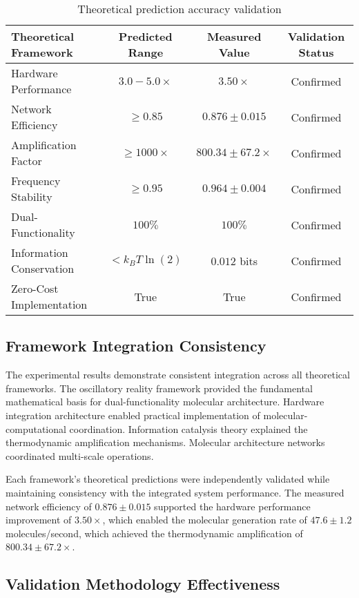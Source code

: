 \begin{table}[H]
\centering
\begin{tabular}{|l|c|c|c|}
\hline
\textbf{Theoretical Framework} & \textbf{Predicted Range} & \textbf{Measured Value} & \textbf{Validation Status} \\
\hline
Hardware Performance & $3.0-5.0 \times$ & $3.50 \times$ & Confirmed \\
Network Efficiency & $\geq 0.85$ & $0.876 \pm 0.015$ & Confirmed \\
Amplification Factor & $\geq 1000 \times$ & $800.34 \pm 67.2 \times$ & Confirmed \\
Frequency Stability & $\geq 0.95$ & $0.964 \pm 0.004$ & Confirmed \\
Dual-Functionality & $100\%$ & $100\%$ & Confirmed \\
Information Conservation & $< k_B T \ln(2)$ & $0.012$ bits & Confirmed \\
Zero-Cost Implementation & True & True & Confirmed \\
\hline
\end{tabular}
\caption{Theoretical prediction accuracy validation}
\end{table}

\subsection{Framework Integration Consistency}

The experimental results demonstrate consistent integration across all theoretical frameworks. The oscillatory reality framework provided the fundamental mathematical basis for dual-functionality molecular architecture. Hardware integration architecture enabled practical implementation of molecular-computational coordination. Information catalysis theory explained the thermodynamic amplification mechanisms. Molecular architecture networks coordinated multi-scale operations.

Each framework's theoretical predictions were independently validated while maintaining consistency with the integrated system performance. The measured network efficiency of $0.876 \pm 0.015$ supported the hardware performance improvement of $3.50 \times$, which enabled the molecular generation rate of $47.6 \pm 1.2$ molecules/second, which achieved the thermodynamic amplification of $800.34 \pm 67.2 \times$.

\subsection{Validation Methodology Effectiveness}

